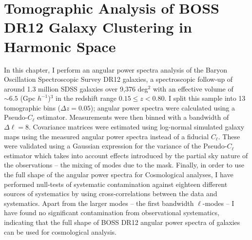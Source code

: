 %
\chapter{Tomographic Analysis of BOSS DR12 Galaxy Clustering in Harmonic Space}
\label{Chap:BOSS}

\vspace*{\fill}

In this chapter, I perform an angular power spectra analysis of the Baryon Oscillation Spectroscopic Survey DR12 galaxies, a spectroscopic follow-up of around 1.3 million SDSS galaxies over 9,376 deg$^2$ with an effective volume of $\sim 6.5$ (Gpc $h^{-1}$)$^3$ in the redshift range $0.15 \leq  z  < 0.80$. I split this sample into 13 tomographic bins ($\Delta z = 0.05$); angular power spectra were calculated using a Pseudo-$C_{\ell}$ estimator. Measurements were then binned with a bandwidth of $\Delta \ell = 8$. Covariance matrices were estimated using log-normal simulated galaxy maps using the measured angular power spectra instead of a fiducial $C_{\ell}$. These were validated using a Gaussian expression for the variance of the Pseudo-$C_{\ell}$ estimator which takes into account effects introduced by the partial sky nature of the observations -- the mixing of modes due to the mask. Finally, in order to use the full shape of the angular power spectra for Cosmological analyses, I have performed null-tests of systematic contamination against eighteen different sources of systematics by using cross-correlations between the data and systematics. Apart from the larger modes -- the first bandwidth $\ell$-modes -- I have found no significant contamination from observational systematics, indicating that the full shape of BOSS DR12 angular power spectra of galaxies can be used for cosmological analysis.

